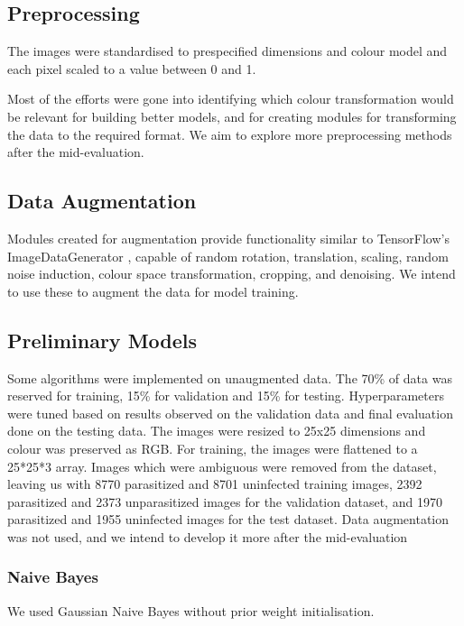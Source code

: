 \documentclass[10pt,twocolumn,letterpaper]{article}
\begin{document}
\subsection{Preprocessing}
The images were standardised to prespecified dimensions and colour model and each pixel scaled to a value between 0 and 1. 

Most of the efforts were gone into identifying which colour transformation would be relevant for building better models, and for creating modules for transforming the data to the required format. We aim to explore more preprocessing methods after the mid-evaluation.

\subsection{Data Augmentation}

Modules created for augmentation provide functionality similar to TensorFlow's ImageDataGenerator \cite{tensorflow_imagedatagen}, capable of random rotation, translation, scaling, random noise induction, colour space transformation, cropping, and denoising. We intend to use these to augment the data for model training.

\subsection{Preliminary Models}

Some algorithms were implemented on unaugmented data. The 70\% of data was reserved for training, 15\% for validation and 15\% for testing. Hyperparameters were tuned based on results observed on the validation data and final evaluation done on the testing data. The images were resized to 25x25 dimensions and colour was preserved as RGB. For training, the images were flattened to a 25*25*3 array. Images which were ambiguous \cite{fuhadmalaria} were removed from the dataset, leaving us with 8770 parasitized and 8701 uninfected training images, 2392 parasitized and 2373 unparasitized images for the validation dataset, and 1970 parasitized and 1955 uninfected images for the test dataset. Data augmentation was not used, and we intend to develop it more after the mid-evaluation

\subsubsection{Naive Bayes}
We used Gaussian Naive Bayes without prior weight initialisation.
\end{document}
